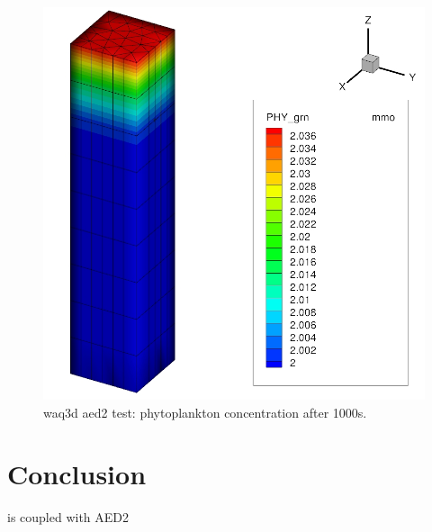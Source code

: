 \begin{figure} [H]
\centering
\includegraphics[scale=0.4]{phyto.jpg}
 \caption{waq3d aed2 test: phytoplankton concentration after 1000s.}
 \label{fig:res}
\end{figure}


%
\section{Conclusion}
%
 is coupled with AED2
%
%

